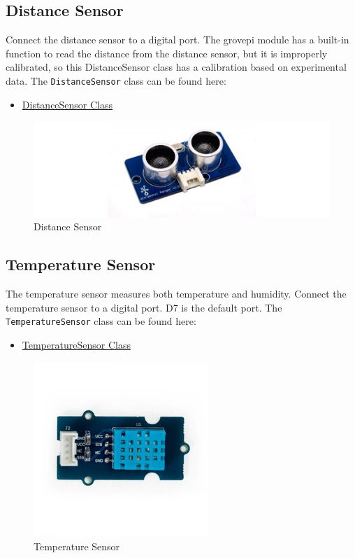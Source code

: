 \subsection{Distance Sensor}\label{distance-sensor}

Connect the distance sensor to a digital port. The grovepi module has a
built-in function to read the distance from the distance sensor, but it
is improperly calibrated, so this DistanceSensor class has a calibration
based on experimental data. The \texttt{DistanceSensor} class can be
found here:

\begin{itemize}
\tightlist
\item
  \href{https://github.com/cloudmesh/cloudmesh.pi/blob/master/cloudmesh/pi/distance.py}{DistanceSensor
  Class}
\end{itemize}

\begin{figure}
\centering
\includegraphics{../images/grovepi/distance.jpg}
\caption{Distance Sensor}
\end{figure}

\subsection{Temperature Sensor}\label{temperature-sensor}

The temperature sensor measures both temperature and humidity. Connect
the temperature sensor to a digital port. D7 is the default port. The
\texttt{TemperatureSensor} class can be found here:

\begin{itemize}
\tightlist
\item
  \href{https://github.com/cloudmesh/cloudmesh.pi/blob/master/cloudmesh/pi/temperature.py}{TemperatureSensor
  Class}
\end{itemize}

\begin{figure}
\centering
\includegraphics{../images/grovepi/temperature.jpg}
\caption{Temperature Sensor}
\end{figure}

